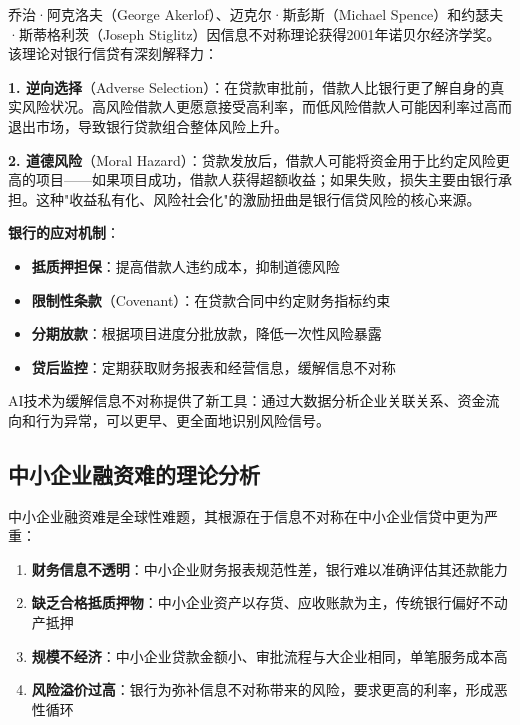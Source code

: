 \begin{theorybox}[信息不对称理论与银行信贷]
乔治·阿克洛夫（George Akerlof）、迈克尔·斯彭斯（Michael Spence）和约瑟夫·斯蒂格利茨（Joseph Stiglitz）因信息不对称理论获得2001年诺贝尔经济学奖。该理论对银行信贷有深刻解释力：

\textbf{1. 逆向选择}（Adverse Selection）：在贷款审批前，借款人比银行更了解自身的真实风险状况。高风险借款人更愿意接受高利率，而低风险借款人可能因利率过高而退出市场，导致银行贷款组合整体风险上升。

\textbf{2. 道德风险}（Moral Hazard）：贷款发放后，借款人可能将资金用于比约定风险更高的项目——如果项目成功，借款人获得超额收益；如果失败，损失主要由银行承担。这种"收益私有化、风险社会化"的激励扭曲是银行信贷风险的核心来源。

\textbf{银行的应对机制}：
\begin{itemize}[leftmargin=1em]
  \item \textbf{抵质押担保}：提高借款人违约成本，抑制道德风险
  \item \textbf{限制性条款}（Covenant）：在贷款合同中约定财务指标约束
  \item \textbf{分期放款}：根据项目进度分批放款，降低一次性风险暴露
  \item \textbf{贷后监控}：定期获取财务报表和经营信息，缓解信息不对称
\end{itemize}

AI技术为缓解信息不对称提供了新工具：通过大数据分析企业关联关系、资金流向和行为异常，可以更早、更全面地识别风险信号。
\end{theorybox}

\subsection{中小企业融资难的理论分析}

中小企业融资难是全球性难题，其根源在于信息不对称在中小企业信贷中更为严重：

\begin{enumerate}[leftmargin=2em]
  \item \textbf{财务信息不透明}：中小企业财务报表规范性差，银行难以准确评估其还款能力
  \item \textbf{缺乏合格抵质押物}：中小企业资产以存货、应收账款为主，传统银行偏好不动产抵押
  \item \textbf{规模不经济}：中小企业贷款金额小、审批流程与大企业相同，单笔服务成本高
  \item \textbf{风险溢价过高}：银行为弥补信息不对称带来的风险，要求更高的利率，形成恶性循环
\end{enumerate}

